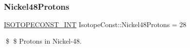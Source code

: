 \subsubsection{\texorpdfstring{Nickel48\+Protons}{Nickel48Protons}}
{\footnotesize\ttfamily \mbox{\hyperlink{group___isotope_const-_macros_ga5f18360b3e99483a35c32d789e62621c}{I\+S\+O\+T\+O\+P\+E\+C\+O\+N\+S\+T\+\_\+\+I\+NT}} Isotope\+Const\+::\+Nickel48\+Protons = 28}

\$ \$ Protons in Nickel-\/48. 